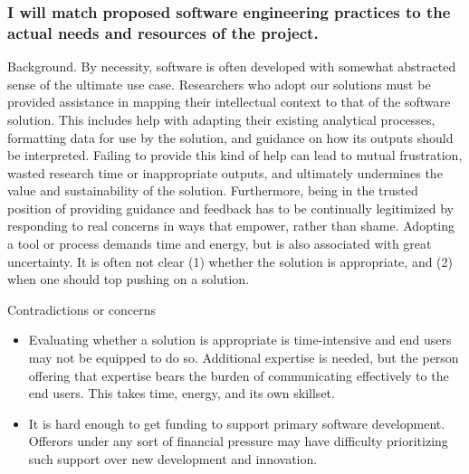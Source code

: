 \documentclass[a4paper,UKenglish]{dagman}
\renewcommand{\paragraph}[1]{\subsubsection*{#1}\xspace}
\begin{document}
\paragraph{I will match proposed software engineering practices to the actual needs and resources of the project.}


Background. By necessity, software is often developed with somewhat abstracted sense of the ultimate use case. Researchers who adopt our solutions must be provided assistance in mapping their intellectual context to that of the software solution. This includes help with adapting their existing analytical processes, formatting data for use by the solution, and guidance on how its outputs should be interpreted. Failing to provide this kind of help can lead to mutual frustration, wasted research time or inappropriate outputs, and ultimately undermines the value and sustainability of the solution. Furthermore, being in the trusted position of providing guidance and feedback has to be continually legitimized by responding to real concerns in ways that empower, rather than shame. Adopting a tool or process demands time and energy, but is also associated with great uncertainty. It is often not clear (1) whether the solution is appropriate, and (2) when one should top pushing on a solution.

Contradictions or concerns
\begin{itemize}
\item Evaluating whether a solution is appropriate is time-intensive and end users may not be equipped to do so. Additional expertise is needed, but the person offering that expertise bears the burden of communicating effectively to the end users. This takes time, energy, and its own skillset.
\item It is hard enough to get funding to support primary software development. Offerors under any sort of financial pressure may have difficulty prioritizing such support over new development and innovation. 
\end{itemize}
\end{document}

